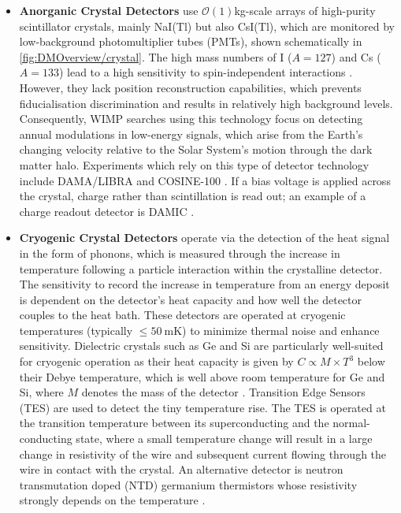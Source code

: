 \begin{itemize}
    \item \textbf{Anorganic Crystal Detectors} use $\mathcal{O}(1)$kg-scale arrays of high-purity scintillator crystals, mainly NaI(Tl) but also CsI(Tl), which are monitored by low-background photomultiplier tubes (PMTs), shown schematically in \autoref{fig:DMOverview/crystal}. The high mass numbers of I ($A=127$) and Cs ($A=133$) lead to a high sensitivity to spin-independent interactions \cite{Schumann:2019eaa}. However, they lack position reconstruction capabilities, which prevents fiducialisation discrimination and results in relatively high background levels. Consequently, WIMP searches using this technology focus on detecting annual modulations in low-energy signals, which arise from the Earth’s changing velocity relative to the Solar System's motion through the dark matter halo. Experiments which rely on this type of detector technology include DAMA/LIBRA \cite{DAMA:2008jlt} and COSINE-100 \cite{COSINE-100:2019lgn}. If a bias voltage is applied across the crystal, charge rather than scintillation is read out; an example of a charge readout detector is DAMIC \cite{Privitera:2024tpq}.
    
    \item \textbf{Cryogenic Crystal Detectors} operate via the detection of the heat signal in the form of phonons, which is measured through the increase in temperature following a particle interaction within the crystalline detector. The sensitivity to record the increase in temperature from an energy deposit is dependent on the detector's heat capacity and how well the detector couples to the heat bath. These detectors are operated at cryogenic temperatures (typically $\leq50~\text{mK}$) to minimize thermal noise and enhance sensitivity. Dielectric crystals such as Ge and Si are particularly well-suited for cryogenic operation as their heat capacity is given by $C \propto M \times T^3$ below their Debye temperature, which is well above room temperature for Ge and Si, where $M$ denotes the mass of the detector \cite{Schumann:2019eaa}. Transition Edge Sensors (TES) are used to detect the tiny temperature rise. The TES is operated at the transition temperature between its superconducting and the normal-conducting state, where a small temperature change will result in a large change in resistivity of the wire and subsequent current flowing through the wire in contact with the crystal. An alternative detector is neutron transmutation doped (NTD) germanium thermistors whose resistivity strongly depends on the temperature \cite{Schumann:2019eaa}. 
    

\end{itemize}
